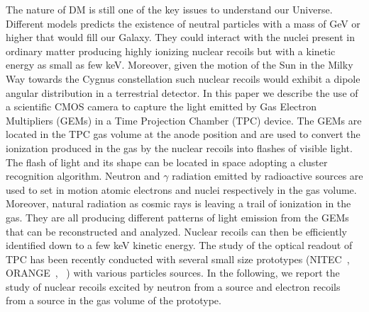 \documentclass[12pt]{iopart}
\begin{document}
The nature of DM is still one of the key  issues to understand  our Universe. Different models  predicts the existence of neutral particles with a mass of GeV  or higher that would fill our Galaxy. They  could interact with the nuclei present in ordinary matter producing highly ionizing nuclear recoils but with a  kinetic energy as small as  few keV. Moreover, given the motion of the Sun in the Milky Way towards the Cygnus constellation such nuclear recoils would exhibit a dipole angular distribution in a terrestrial detector.
In this paper we describe the use of a scientific CMOS camera to capture the light emitted by Gas Electron Multipliers (GEMs) in a Time Projection Chamber (TPC) device. The GEMs are located in the TPC gas volume at the anode position and are used to convert the ionization produced in the gas by   the  nuclear recoils into flashes of visible light. The flash of light and its shape  can be located in space adopting a cluster  recognition algorithm. Neutron and  $\gamma$ radiation emitted by radioactive sources are used to  set in motion  atomic electrons and nuclei respectively in the gas volume. Moreover, natural radiation as cosmic rays is leaving a trail of ionization in the gas. They are all producing different  patterns of light emission from the GEMs that can be reconstructed and analyzed. Nuclear recoils can then be efficiently identified down to a few keV kinetic energy. 
 The study of the optical readout of TPC has been recently conducted with several small size prototypes (NITEC~\cite{JINST:nitec}, ORANGE~\cite{NIM:Marafinietal, bib:jinst_orange2}, \lemon~\cite{bib:eps, bib:ieee17, bib:elba}) with various particles sources. In the following, we report the study of nuclear recoils excited by neutron from a  \ambe source and electron recoils from a \fe source in the gas volume of the  \lemon prototype.
\end{document}
